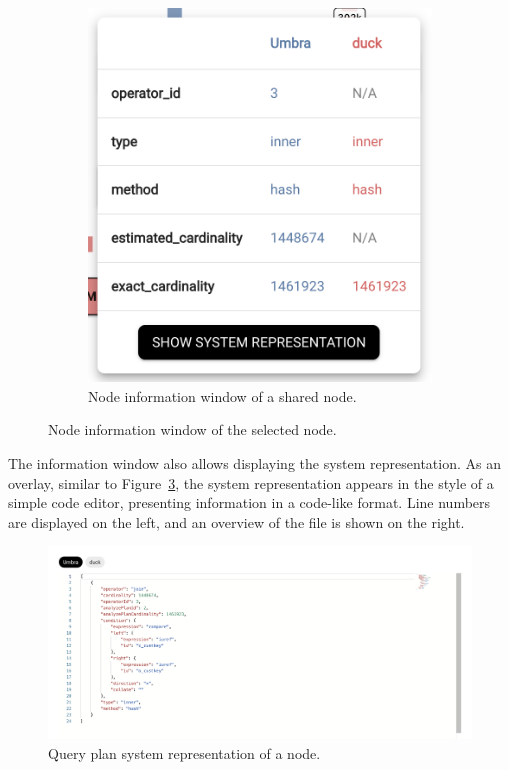 \begin{figure}[h]
\begin{subfigure}[b]{0.4\linewidth}
      \includegraphics[width=0.8\linewidth]{figures/query-plan-node-info-combined.png}
      \caption{Node information window of a shared node.}
      \label{fig:query-plan-node-info-combined}
  \end{subfigure}
  \caption{Node information window of the selected node.}
  \label{fig:query-plan-node-info}
\end{figure}

The information window also allows displaying the system representation. As an overlay, similar to Figure~\ref{fig:query-plan-system-representation}, the system representation appears in the style of a simple code editor, presenting information in a code-like format. Line numbers are displayed on the left, and an overview of the file is shown on the right.

\begin{figure}[h]
  \centering
  \includegraphics[width=0.8\linewidth]{figures/query-plan-node-system-representation-combined.png}
  \caption{Query plan system representation of a node.}
  \label{fig:query-plan-system-representation}
\end{figure}

